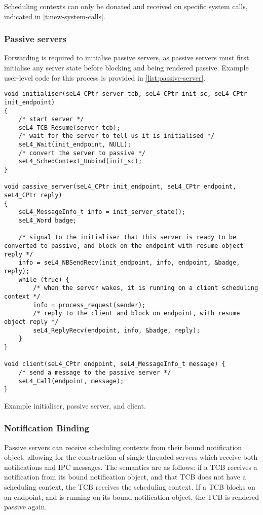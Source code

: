 Scheduling contexts can only be donated and received on specific system calls, indicated in
\cref{t:new-system-calls}. 

\subsubsection{Passive servers}
\label{sec:impl-passive-servers}

Forwarding is required to initialise passive servers, as passive servers must first initialise any 
server state before blocking and being rendered passive. Example user-level code for this process is 
provided in \cref{list:passive-server}. 

\begin{listing}[t]
\begin{verbatim}
void initialiser(seL4_CPtr server_tcb, seL4_CPtr init_sc, seL4_CPtr init_endpoint) 
{
    /* start server */
    seL4_TCB_Resume(server_tcb);
    /* wait for the server to tell us it is initialised */
    seL4_Wait(init_endpoint, NULL);
    /* convert the server to passive */
    seL4_SchedContext_Unbind(init_sc);
}

void passive_server(seL4_CPtr init_endpoint, seL4_CPtr endpoint, seL4_CPtr reply) 
{    
    seL4_MessageInfo_t info = init_server_state();
    seL4_Word badge;

    /* signal to the initialiser that this server is ready to be converted to passive, and block on the endpoint with resume object reply */
    info = seL4_NBSendRecv(init_endpoint, info, endpoint, &badge, reply);
    while (true) {
        /* when the server wakes, it is running on a client scheduling context */
        info = process_request(sender);
        /* reply to the client and block on endpoint, with resume object reply */
        seL4_ReplyRecv(endpoint, info, &badge, reply);
    }
}

void client(seL4_CPtr endpoint, seL4_MessageInfo_t message) {
    /* send a message to the passive server */
    seL4_Call(endpoint, message);
}
\end{verbatim}
\caption{Example initialiser, passive server, and client.}
\label{list:passive-server}
\end{listing}

\subsubsection{Notification Binding}

Passive servers can receive scheduling contexts from their bound notification object, allowing for
the construction of single-threaded servers which receive both notifications and IPC messages. 
The semantics are as follows: if a TCB receives a notification from its bound notification
object, and that TCB does not have a scheduling context, the TCB receives the scheduling context.
If a TCB blocks on an endpoint, and is running on its bound notification object, the TCB is
rendered passive again. 

